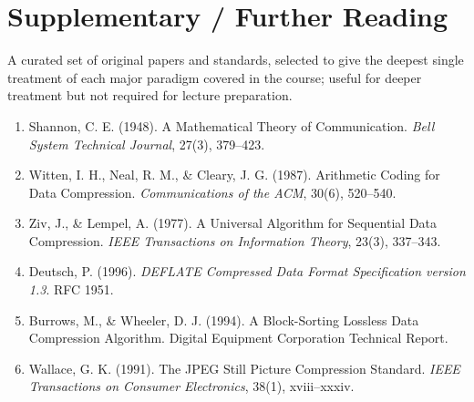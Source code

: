 \documentclass{article}
\begin{document}
\section*{Supplementary / Further Reading}
A curated set of original papers and standards, selected to give the deepest single treatment of each major paradigm covered in the course; useful for deeper treatment but not required for lecture preparation.
\begin{enumerate}
    \item[{[Sha48]}] Shannon, C. E. (1948). A Mathematical Theory of Communication. \textit{Bell System Technical Journal}, 27(3), 379--423.
    \item[{[WNC87]}] Witten, I. H., Neal, R. M., \& Cleary, J. G. (1987). Arithmetic Coding for Data Compression. \textit{Communications of the ACM}, 30(6), 520--540.
    \item[{[LZ77]}] Ziv, J., \& Lempel, A. (1977). A Universal Algorithm for Sequential Data Compression. \textit{IEEE Transactions on Information Theory}, 23(3), 337--343.
    \item[{[RFC1951]}] Deutsch, P. (1996). \textit{DEFLATE Compressed Data Format Specification version 1.3}. RFC 1951.
    \item[{[BW94]}] Burrows, M., \& Wheeler, D. J. (1994). A Block-Sorting Lossless Data Compression Algorithm. Digital Equipment Corporation Technical Report.
    \item[{[Wal91]}] Wallace, G. K. (1991). The JPEG Still Picture Compression Standard. \textit{IEEE Transactions on Consumer Electronics}, 38(1), xviii--xxxiv.
\end{enumerate}
\end{document}
